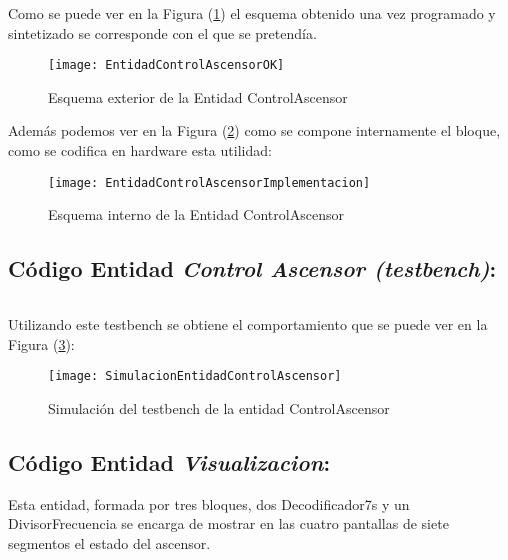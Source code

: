 	\inputminted[frame=lines,fontsize=\footnotesize,linenos]{vhdl}{CodeFiles/EntidadControlAscensor.vhd}

	Como se puede ver en la Figura (\ref{fig:EntidadControlAscensorOK}) el esquema obtenido una vez programado y sintetizado se corresponde con el que se pretendía.
    \begin{figure}[H]
		    \centering
		    \texttt{[image: EntidadControlAscensorOK]}
		    \caption{Esquema exterior de la Entidad ControlAscensor}
		    \label{fig:EntidadControlAscensorOK}
	\end{figure}
    Además podemos ver en la Figura (\ref{fig:EntidadControlAscensorImplementacion}) como se compone internamente el bloque, como se codifica en hardware esta utilidad:
    \begin{figure}[H]
		    \centering
		    \texttt{[image: EntidadControlAscensorImplementacion]}
		    \caption{Esquema interno de la Entidad ControlAscensor}
		    \label{fig:EntidadControlAscensorImplementacion}
	\end{figure}

\subsection{Código Entidad \textit{Control Ascensor (testbench)}:} \label{code:ControlAscensor_tb}
	\inputminted[frame=lines,fontsize=\footnotesize,linenos]{vhdl}{CodeFiles/EntidadControlAscensor_tb.vhd}

    Utilizando este testbench se obtiene el comportamiento que se puede ver en la Figura (\ref{fig:SimulacionEntidadControlAscensor}):

    \begin{figure}[H]
		    \centering
		    \texttt{[image: SimulacionEntidadControlAscensor]}
		    \caption{Simulación del testbench de la entidad ControlAscensor}
		    \label{fig:SimulacionEntidadControlAscensor}
	\end{figure}

\subsection{Código Entidad \textit{Visualizacion}:} \label{code:Visualizacion}

Esta entidad, formada por tres bloques, dos Decodificador7s y un DivisorFrecuencia se encarga de mostrar en las cuatro pantallas de siete segmentos el estado del ascensor. \\ 
	\inputminted[frame=lines,fontsize=\footnotesize,linenos]{vhdl}{CodeFiles/EntidadVisualizacion.vhd}

